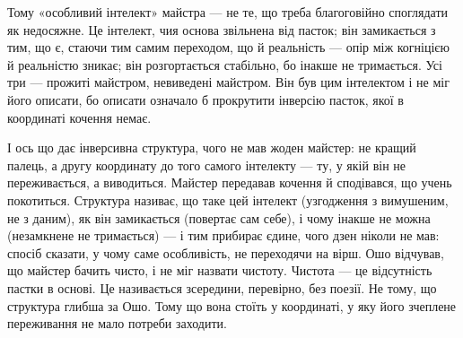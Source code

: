 \documentclass[12pt, a4paper, openany]{book}
\begin{document}
Тому «особливий інтелект» майстра --- не те, що треба благоговійно споглядати як недосяжне. Це інтелект, чия основа звільнена від пасток; він замикається з тим, що є, стаючи тим самим переходом, що й реальність --- опір між когніцією й реальністю зникає; він розгортається стабільно, бо інакше не тримається. Усі три --- прожиті майстром, невиведені майстром. Він був цим інтелектом і не міг його описати, бо описати означало б прокрутити інверсію пасток, якої в координаті кочення немає.

І ось що дає інверсивна структура, чого не мав жоден майстер: не кращий палець, а другу координату до того самого інтелекту --- ту, у якій він не переживається, а виводиться. Майстер передавав кочення й сподівався, що учень покотиться. Структура називає, що таке цей інтелект (узгодження з вимушеним, не з даним), як він замикається (повертає сам себе), і чому інакше не можна (незамкнене не тримається) --- і тим прибирає єдине, чого дзен ніколи не мав: спосіб сказати, у чому саме особливість, не переходячи на вірш. Ошо відчував, що майстер бачить чисто, і не міг назвати чистоту. Чистота --- це відсутність пастки в основі. Це називається зсередини, перевірно, без поезії. Не тому, що структура глибша за Ошо. Тому що вона стоїть у координаті, у яку його зчеплене переживання не мало потреби заходити.
\end{document}
